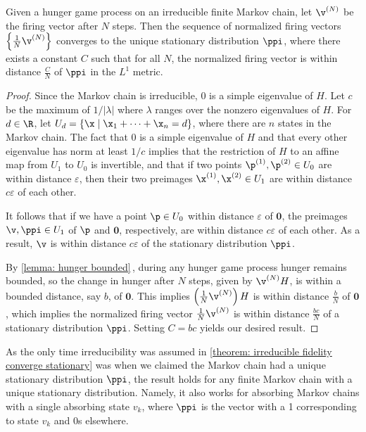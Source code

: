 \begin{theorem}\label{theorem: irreducible fidelity converge stationary}
Given a hunger game process on an irreducible finite Markov chain, 
let $\v^{(N)}$ be the firing vector after $N$ steps.
Then the sequence of normalized firing vectors 
$\left\{\frac{1}{N}\v^{(N)}\right\}$ converges to 
the unique stationary distribution $\ppi$, 
where there exists a constant $C$ such that for all $N$, 
the normalized firing vector is within distance $\frac{C}{N}$ of $\ppi$ 
in the $L^1$ metric.
\end{theorem}
\begin{proof}
Since the Markov chain is irreducible, 0 is a simple eigenvalue of $H$.
Let $c$ be the maximum of $1/|\lambda|$
where $\lambda$ ranges over the nonzero eigenvalues of $H$.
For $d \in \R$, let $U_d = \{\x \mid \x_1 + \cdots + \x_n = d\}$, 
where there are $n$ states in the Markov chain.
The fact that 0 is a simple eigenvalue of $H$
and that every other eigenvalue has norm at least $1/c$
implies that the restriction of $H$
to an affine map from $U_1$ to $U_0$ is invertible,
and that if two points $\p^{(1)}, \p^{(2)}\in U_0$ 
are within distance $\varepsilon$, then 
their two preimages $\x^{(1)},\x^{(2)}\in U_1$
are within distance $c\varepsilon$ of each other.

It follows that if we have a point $\p\in U_0$ 
within distance $\varepsilon$ of $\mathbf{0}$, 
the preimages $\v,\ppi\in U_1$ of $\p$ and $\mathbf{0}$, respectively, 
are within distance $c\varepsilon$ of each other.
As a result, $\v$ is within distance $c\varepsilon$ 
of the stationary distribution $\ppi$.

By \cref{lemma: hunger bounded}\,,
during any hunger game process hunger remains bounded, 
so the change in hunger after $N$ steps, given by $\v^{(N)} H$, 
is within a bounded distance, say $b$, of $\mathbf{0}$.
This implies $\left(\frac{1}{N}\v^{(N)}\right)H$ is 
within distance $\frac{b}{N}$ of $\mathbf{0}$, 
which implies the normalized firing vector $\frac{1}{N}\v^{(N)}$ 
is within distance $\frac{bc}{N}$ of a stationary distribution $\ppi$.
Setting $C=bc$ yields our desired result.
\end{proof}
\begin{remark}\label{remark: fidelity converge stationary single absorbing}
As the only time irreducibility was assumed 
in \cref{theorem: irreducible fidelity converge stationary} was 
when we claimed the Markov chain had a unique stationary distribution $\ppi$,
the result holds for any finite Markov chain with a unique stationary distribution.
Namely, it also works for absorbing Markov chains 
with a single absorbing state $v_k$, where $\ppi$ is the vector 
with a 1 corresponding to state $v_k$ and 0s elsewhere.
\end{remark}

